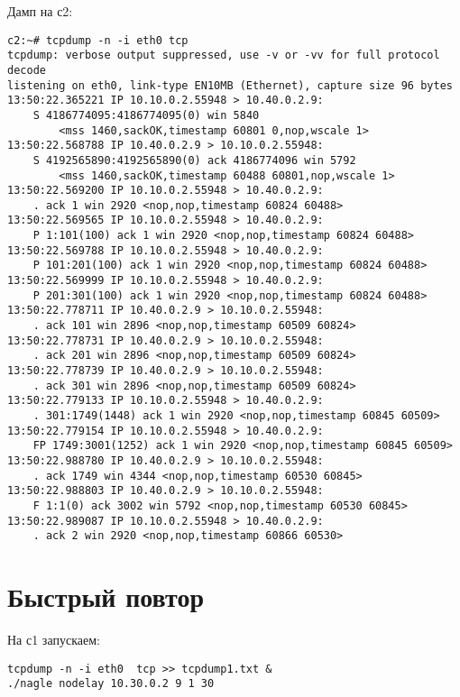 \documentclass[a4paper,12pt]{article}
\begin{document}
Дамп на с2:
\begin{Verbatim}
c2:~# tcpdump -n -i eth0 tcp
tcpdump: verbose output suppressed, use -v or -vv for full protocol decode
listening on eth0, link-type EN10MB (Ethernet), capture size 96 bytes
13:50:22.365221 IP 10.10.0.2.55948 > 10.40.0.2.9: 
    S 4186774095:4186774095(0) win 5840 
        <mss 1460,sackOK,timestamp 60801 0,nop,wscale 1>
13:50:22.568788 IP 10.40.0.2.9 > 10.10.0.2.55948: 
    S 4192565890:4192565890(0) ack 4186774096 win 5792 
        <mss 1460,sackOK,timestamp 60488 60801,nop,wscale 1>
13:50:22.569200 IP 10.10.0.2.55948 > 10.40.0.2.9: 
    . ack 1 win 2920 <nop,nop,timestamp 60824 60488>
13:50:22.569565 IP 10.10.0.2.55948 > 10.40.0.2.9: 
    P 1:101(100) ack 1 win 2920 <nop,nop,timestamp 60824 60488>
13:50:22.569788 IP 10.10.0.2.55948 > 10.40.0.2.9: 
    P 101:201(100) ack 1 win 2920 <nop,nop,timestamp 60824 60488>
13:50:22.569999 IP 10.10.0.2.55948 > 10.40.0.2.9: 
    P 201:301(100) ack 1 win 2920 <nop,nop,timestamp 60824 60488>
13:50:22.778711 IP 10.40.0.2.9 > 10.10.0.2.55948: 
    . ack 101 win 2896 <nop,nop,timestamp 60509 60824>
13:50:22.778731 IP 10.40.0.2.9 > 10.10.0.2.55948: 
    . ack 201 win 2896 <nop,nop,timestamp 60509 60824>
13:50:22.778739 IP 10.40.0.2.9 > 10.10.0.2.55948: 
    . ack 301 win 2896 <nop,nop,timestamp 60509 60824>
13:50:22.779133 IP 10.10.0.2.55948 > 10.40.0.2.9: 
    . 301:1749(1448) ack 1 win 2920 <nop,nop,timestamp 60845 60509>
13:50:22.779154 IP 10.10.0.2.55948 > 10.40.0.2.9: 
    FP 1749:3001(1252) ack 1 win 2920 <nop,nop,timestamp 60845 60509>
13:50:22.988780 IP 10.40.0.2.9 > 10.10.0.2.55948: 
    . ack 1749 win 4344 <nop,nop,timestamp 60530 60845>
13:50:22.988803 IP 10.40.0.2.9 > 10.10.0.2.55948: 
    F 1:1(0) ack 3002 win 5792 <nop,nop,timestamp 60530 60845>
13:50:22.989087 IP 10.10.0.2.55948 > 10.40.0.2.9: 
    . ack 2 win 2920 <nop,nop,timestamp 60866 60530>
\end{Verbatim}

\section{Быстрый повтор}

На с1 запускаем:
\begin{Verbatim}
tcpdump -n -i eth0  tcp >> tcpdump1.txt &
./nagle nodelay 10.30.0.2 9 1 30
\end{Verbatim}
\end{document}
